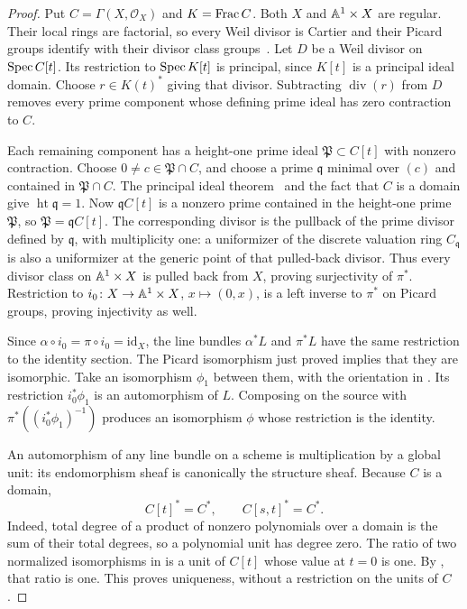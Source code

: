 \begin{proof}
Put $C=\Gamma(X,\mathcal O_X)$ and $K=\operatorname{Frac} C$.
Both $X$ and $\mathbb A^1\times X$ are regular. Their local rings are
factorial, so every Weil divisor is Cartier and their Picard groups
identify with their divisor class groups~\cite[Tags~056S, 0AG0, and~0BE9]{Stacks}.
Let $D$ be a Weil divisor on
$\operatorname{Spec} C[t]$. Its restriction to $\operatorname{Spec} K[t]$ is principal, since
$K[t]$ is a principal ideal domain. Choose $r\in K(t)^*$ giving
that divisor. Subtracting $\operatorname{div}(r)$ from $D$ removes
every prime component whose defining prime ideal has zero
contraction to $C$.

Each remaining component has a height-one prime ideal
$\mathfrak P\subset C[t]$ with nonzero contraction. Choose
$0\ne c\in\mathfrak P\cap C$, and choose a prime
$\mathfrak q$ minimal over $(c)$ and contained in
$\mathfrak P\cap C$. The principal ideal theorem~\cite[Tag~00KV]{Stacks}
and the fact that
$C$ is a domain give $\operatorname{ht}\mathfrak q=1$.
Now $\mathfrak qC[t]$ is a nonzero prime contained in the
height-one prime $\mathfrak P$, so
$\mathfrak P=\mathfrak qC[t]$.
The corresponding divisor is the pullback of the prime divisor
defined by $\mathfrak q$, with multiplicity one: a uniformizer
of the discrete valuation ring $C_{\mathfrak q}$ is also a
uniformizer at the generic point of that pulled-back divisor.
Thus every divisor class on $\mathbb A^1\times X$ is pulled back
from $X$, proving surjectivity of $\pi^*$. Restriction to
$i_0\colon X\to\mathbb A^1\times X$, $x\mapsto(0,x)$, is a left
inverse to $\pi^*$ on Picard groups, proving injectivity as well.

Since $\alpha\circ i_0=\pi\circ i_0=\mathrm{id}_X$, the line
bundles $\alpha^*L$ and $\pi^*L$ have the same restriction to
the identity section. The Picard isomorphism just proved implies
that they are isomorphic. Take an isomorphism $\phi_1$ between
them, with the orientation in .
Its restriction $i_0^*\phi_1$ is an automorphism of $L$.
Composing on the source with
$\pi^*((i_0^*\phi_1)^{-1})$ produces an isomorphism $\phi$
whose restriction is the identity.

An automorphism of any line bundle on a scheme is multiplication
by a global unit: its endomorphism sheaf is canonically the
structure sheaf. Because $C$ is a domain,
\begin{equation}
\label{bun:parameter-units}
 C[t]^*=C^*,\qquad C[s,t]^*=C^*.
\end{equation}
Indeed, total degree of a product of nonzero polynomials over a
domain is the sum of their total degrees, so a polynomial unit
has degree zero. The ratio of two normalized isomorphisms in
 is a unit of $C[t]$ whose value at
$t=0$ is one. By , that ratio is one.
This proves uniqueness, without a restriction on the units of $C$.


\end{proof}
